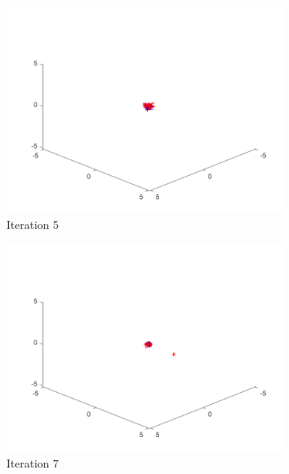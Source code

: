 \begin{figure}
\begin{subfigure}[b]{0.4\textwidth}
    \includegraphics[width=\textwidth]{img/smpl/fn4d/loa-iter-5}
    \caption{Iteration 5}
    \label{fig:s3-iter-2}
  \end{subfigure}
  \begin{subfigure}[b]{0.4\textwidth}
    \includegraphics[width=\textwidth]{img/smpl/fn4d/loa-iter-7}
    \caption{Iteration 7}
    \label{fig:s3-iter-3}
  \end{subfigure}
  \begin{subfigure}[b]{0.4\textwidth}

\end{subfigure}
\end{figure}
